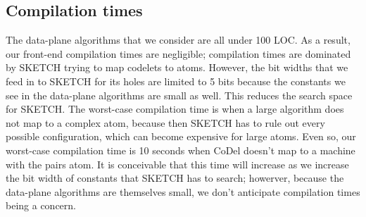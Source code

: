\subsection{Compilation times}
The data-plane algorithms that we consider are all under 100 LOC. As a result,
our front-end compilation times are negligible; compilation times are dominated
by  SKETCH trying to map codelets to atoms. However, the bit widths that we
feed in to SKETCH for its holes are limited to 5 bits because the constants we
see in the data-plane algorithms are small as well. This reduces the search
space for SKETCH.  The worst-case compilation time is when a large algorithm
does not map to a complex atom, because then SKETCH has to rule out every
possible configuration, which can become expensive for large atoms. Even so,
our worst-case compilation time is 10 seconds when CoDel doesn't map to a
\absmachine machine with the pairs atom. It is conceivable that this time will
increase as we increase the bit width of constants that SKETCH has to search;
howerver, because the data-plane algorithms are themselves small, we don't
anticipate compilation times being a concern.
